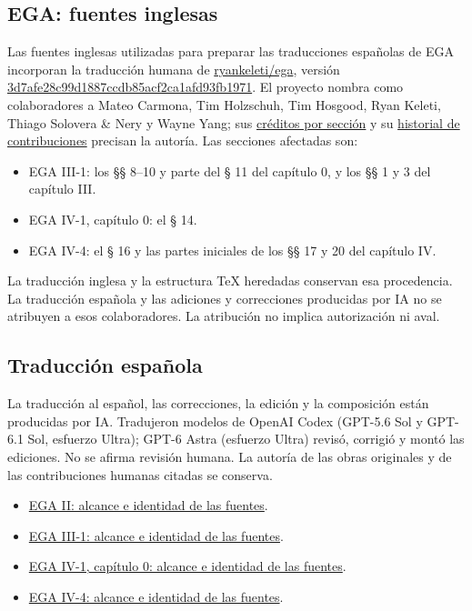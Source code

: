 \documentclass[10pt,oneside,openany]{book}
\theoremstyle{egaenv}\newtheorem*{env}{---}
\theoremstyle{egastatement}
\theoremstyle{egadescription}
\begin{document}
\subsection*{EGA: fuentes inglesas}

Las fuentes inglesas utilizadas para preparar las traducciones españolas de EGA incorporan la traducción humana de \href{https://github.com/ryankeleti/ega}{ryankeleti/ega}, versión \href{https://github.com/ryankeleti/ega/tree/3d7afe28c99d1887ccdb85acf2ca1afd93fb1971}{3d7afe28c99d1887ccdb85acf2ca1afd93fb1971}. El proyecto nombra como colaboradores a Mateo Carmona, Tim Holzschuh, Tim Hosgood, Ryan Keleti, Thiago Solovera \& Nery y Wayne Yang; sus \href{https://github.com/ryankeleti/ega/blob/3d7afe28c99d1887ccdb85acf2ca1afd93fb1971/README.md}{créditos por sección} y su \href{https://github.com/ryankeleti/ega/commits/3d7afe28c99d1887ccdb85acf2ca1afd93fb1971}{historial de contribuciones} precisan la autoría. Las secciones afectadas son:

\begin{itemize}
\item EGA III-1: los §§ 8–10 y parte del § 11 del capítulo 0, y los §§ 1 y 3 del capítulo III.
\item EGA IV-1, capítulo 0: el § 14.
\item EGA IV-4: el § 16 y las partes iniciales de los §§ 17 y 20 del capítulo IV.
\end{itemize}

La traducción inglesa y la estructura TeX heredadas conservan esa procedencia. La traducción española y las adiciones y correcciones producidas por IA no se atribuyen a esos colaboradores. La atribución no implica autorización ni aval.

\subsection*{Traducción española}

La traducción al español, las correcciones, la edición y la composición están producidas por IA. Tradujeron modelos de OpenAI Codex (GPT-5.6 Sol y GPT-6.1 Sol, esfuerzo Ultra); GPT-6 Astra (esfuerzo Ultra) revisó, corrigió y montó las ediciones. No se afirma revisión humana. La autoría de las obras originales y de las contribuciones humanas citadas se conserva.

\begin{itemize}
\item \href{../../tree/repo/editions/II\_CURRENT/FUENTES.md}{EGA II: alcance e identidad de las fuentes}.
\item \href{../../tree/repo/editions/III1\_CURRENT/FUENTES.md}{EGA III-1: alcance e identidad de las fuentes}.
\item \href{../../tree/repo/editions/IV1\_CURRENT/FUENTES.md}{EGA IV-1, capítulo 0: alcance e identidad de las fuentes}.
\item \href{../../tree/repo/editions/IV4/FUENTES.md}{EGA IV-4: alcance e identidad de las fuentes}.
\end{itemize}
\end{document}
